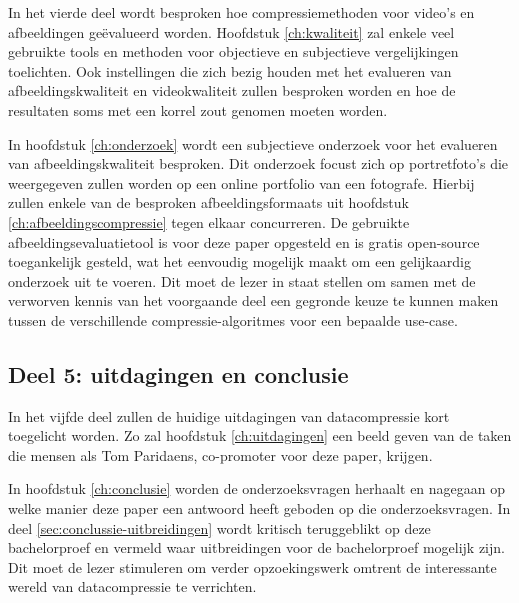 In het vierde deel wordt besproken hoe compressiemethoden voor video's en afbeeldingen geëvalueerd worden. Hoofdstuk \ref{ch:kwaliteit} zal enkele veel gebruikte tools en methoden voor objectieve en subjectieve vergelijkingen toelichten. Ook instellingen die zich bezig houden met het evalueren van afbeeldingskwaliteit en videokwaliteit zullen besproken worden en hoe de resultaten soms met een korrel zout genomen moeten worden.

In hoofdstuk \ref{ch:onderzoek} wordt een subjectieve onderzoek voor het evalueren van afbeeldingskwaliteit besproken. Dit onderzoek focust zich op portretfoto's die weergegeven zullen worden op een online portfolio van een fotografe. Hierbij zullen enkele van de besproken \glspl{afbeeldingsformaat} uit hoofdstuk \ref{ch:afbeeldingscompressie} tegen elkaar concurreren. De gebruikte \gls{afbeeldingsevaluatietool} is voor deze paper opgesteld en is gratis \gls{open-source} toegankelijk gesteld, wat het eenvoudig mogelijk maakt om een gelijkaardig onderzoek uit te voeren. Dit moet de lezer in staat stellen om samen met de verworven kennis van het voorgaande deel een gegronde keuze te kunnen maken tussen de verschillende \glspl{compressie-algoritme} voor een bepaalde \gls{use-case}.

\subsection{Deel 5: uitdagingen en conclusie}
\label{sec:opzet-bachelorproef-deel-5}

In het vijfde deel zullen de huidige uitdagingen van \gls{datacompressie} kort toegelicht worden. Zo zal hoofdstuk \ref{ch:uitdagingen} een beeld geven van de taken die mensen als Tom Paridaens, co-promoter voor deze paper, krijgen.

In hoofdstuk \ref{ch:conclusie} worden de onderzoeksvragen herhaalt en nagegaan op welke manier deze paper een antwoord heeft geboden op die onderzoeksvragen. In deel \ref{sec:conclussie-uitbreidingen} wordt kritisch teruggeblikt op deze bachelorproef en vermeld waar uitbreidingen voor de bachelorproef mogelijk zijn. Dit moet de lezer stimuleren om verder opzoekingswerk omtrent de interessante wereld van \gls{datacompressie} te verrichten.